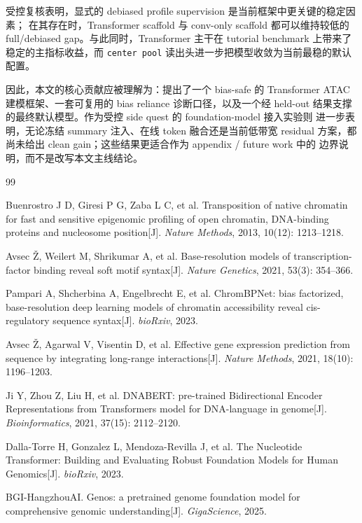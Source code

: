 \documentclass[11pt,a4paper]{ctexart}
\begin{document}
受控复核表明，显式的 debiased profile supervision 是当前框架中更关键的稳定因素；
在其存在时，Transformer scaffold 与 conv-only scaffold 都可以维持较低的
full/debiased gap。与此同时，Transformer 主干在 tutorial benchmark 上带来了
稳定的主指标收益，而 \texttt{center pool} 读出头进一步把模型收敛为当前最稳的默认配置。

因此，本文的核心贡献应被理解为：提出了一个 bias-safe 的 Transformer
ATAC 建模框架、一套可复用的 bias reliance 诊断口径，以及一个经 held-out
结果支撑的最终默认模型。作为受控 side quest 的 foundation-model 接入实验则
进一步表明，无论冻结 summary 注入、在线 token 融合还是当前低带宽 residual
方案，都尚未给出 clean gain；这些结果更适合作为 appendix / future work 中的
边界说明，而不是改写本文主线结论。

\begin{thebibliography}{99}

Buenrostro J D, Giresi P G, Zaba L C, et al.
Transposition of native chromatin for fast and sensitive epigenomic profiling
of open chromatin, DNA-binding proteins and nucleosome position[J].
\emph{Nature Methods}, 2013, 10(12): 1213--1218.

Avsec \v{Z}, Weilert M, Shrikumar A, et al.
Base-resolution models of transcription-factor binding reveal soft motif
syntax[J]. \emph{Nature Genetics}, 2021, 53(3): 354--366.

Pampari A, Shcherbina A, Engelbrecht E, et al.
ChromBPNet: bias factorized, base-resolution deep learning models of
chromatin accessibility reveal cis-regulatory sequence syntax[J].
\emph{bioRxiv}, 2023.

Avsec \v{Z}, Agarwal V, Visentin D, et al.
Effective gene expression prediction from sequence by integrating long-range
interactions[J]. \emph{Nature Methods}, 2021, 18(10): 1196--1203.

Ji Y, Zhou Z, Liu H, et al.
DNABERT: pre-trained Bidirectional Encoder Representations from Transformers
model for DNA-language in genome[J].
\emph{Bioinformatics}, 2021, 37(15): 2112--2120.

Dalla-Torre H, Gonzalez L, Mendoza-Revilla J, et al.
The Nucleotide Transformer: Building and Evaluating Robust Foundation Models
for Human Genomics[J]. \emph{bioRxiv}, 2023.

BGI-HangzhouAI.
Genos: a pretrained genome foundation model for comprehensive genomic
understanding[J]. \emph{GigaScience}, 2025.

\end{thebibliography}
\end{document}
